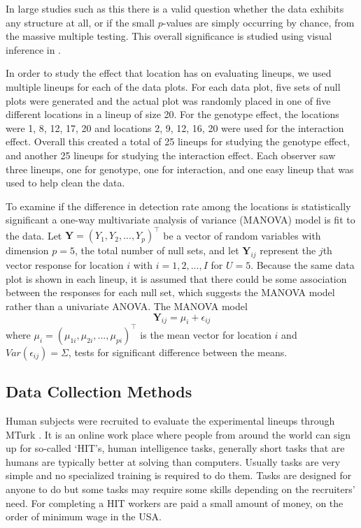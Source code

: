 \documentclass[10pt]{article}\usepackage[]{graphicx}\usepackage[]{xcolor}
\begin{document}
In large studies such as this there is a valid question whether the data exhibits any structure at all, or if the small $p$-values are simply occurring by chance, from the massive multiple testing. This overall significance is studied using visual inference  in \citet{tengfei:2013}. 

In order to study the effect that  location has on evaluating lineups, we used multiple lineups for each of the data plots. For each data plot, five sets of null plots were generated and the actual plot was randomly placed in one of five different locations in a lineup of size 20. 
For the genotype effect, the locations were  1, 8, 12, 17, 20 and locations 2, 9, 12, 16, 20 were used for the interaction effect. %
Overall this created a total of 25 lineups for studying the genotype effect, and another 25 lineups for studying the interaction effect. Each observer saw three lineups, one for genotype, one for interaction, and one easy lineup that was used to help clean the data. 

To examine if the difference in detection rate among the locations is statistically significant a one-way multivariate analysis of variance (MANOVA) model is fit to the data.
Let $\mathbf{Y}=(Y_1,Y_2, ... , Y_p)^\top$ be a vector of random variables with dimension $p = 5$, the total number of null sets, and let $\mathbf{Y}_{ij}$ represent the $j$th vector response for  location $i$ with $i=1,2, ..., I$ for $U=5$. Because the same data plot is shown in each lineup, it is assumed that there could be some association between the responses for each null set, which suggests the MANOVA model rather than a univariate ANOVA.  The MANOVA model 
\begin{equation}\label{manova}
\mathbf{Y}_{ij} = \mu_{i} + \epsilon_{ij}
\end{equation}
where $\mu_{i}= (\mu_{1i},\mu_{2i}, ..., \mu_{pi})^\top$ is the mean vector for location $i$ and $Var(\epsilon_{ij})=\Sigma$, tests for significant difference between the means. 

\subsection{Data Collection Methods}  Human subjects were recruited to evaluate the experimental lineups through MTurk \citep{turk}.  It is an online work place where people from around the world can sign up for so-called `HIT's, human intelligence tasks, generally short tasks that are humans are typically better at solving than computers. Usually tasks are very simple and no specialized training is required to do them. Tasks are designed for anyone to do but some tasks may require some skills depending on the recruiters' need. %
 For completing a HIT workers are paid a small amount of money, on the order of minimum wage in the USA. 
\end{document}
